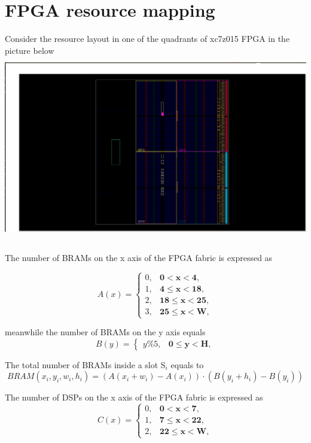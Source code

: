 \documentclass[11pt]{article}
\theoremstyle{definition}
\begin{document}
\section{FPGA resource mapping}
Consider the resource layout in one of the quadrants of xc7z015 FPGA in the picture below
\includegraphics[width=\textwidth, height=8cm]{graphics/fpga_1.png} \\ \\

The number of BRAMs on the x axis of the FPGA fabric is expressed as 

\begin{equation}
A(x) = \begin{cases}
0, & \textbf{0$<$x$<$4}, \\
1, & \textbf{4$\leq$x$<$18}, \\
2, & \textbf{18$\leq$x$<$25}, \\
3, & \textbf{25$\leq$x$<$W},
\end{cases}
\end{equation}

meanwhile the number of BRAMs on the y axis equals 
\begin{equation}
B(y) = \begin{cases} 
y\%5, & \textbf{0$\leq$y$<$H},
\end{cases}
\end{equation}

The total number of BRAMs inside a slot S$_i$ equals to \\
\begin{equation}
BRAM(x_i,y_i,w_i,h_i) =  (A(x_i+w_i) - A(x_i)) \cdot (B(y_i+h_i) - B(y_i))
\end{equation}

The number of DSPs on the x axis of the FPGA fabric is expressed as 
\begin{equation}
C(x) = \begin{cases}
0, & \textbf{0$<$x$<$7}, \\
1, & \textbf{7$\leq$x$<$22}, \\
2, & \textbf{22$\leq$x$<$W},
\end{cases}
\end{equation}
\end{document}
